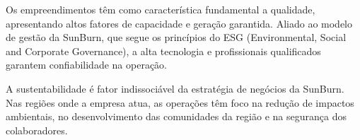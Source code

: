Os empreendimentos têm como característica fundamental a qualidade, apresentando altos fatores de capacidade e geração garantida. Aliado ao modelo de gestão da SunBurn, que segue os princípios do ESG (Environmental, Social and Corporate Governance), a alta tecnologia e profissionais qualificados garantem confiabilidade na operação.

A sustentabilidade é fator indissociável da estratégia de negócios da SunBurn. Nas regiões onde a empresa atua, as operações têm foco na redução de impactos ambientais, no desenvolvimento das comunidades da região e na segurança dos colaboradores.




